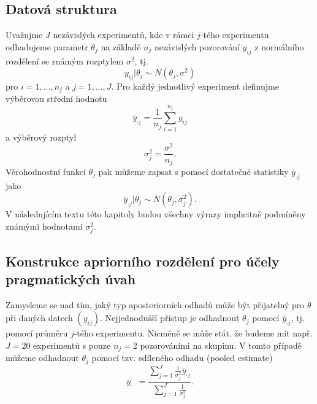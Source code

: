 \subsection{Datová struktura}

Uvažujme $J$ nezávislých experimentů, kde v rámci $j$-tého experimentu odhadujeme parametr $\theta_j$ na základě $n_j$ nezávislých pozorování $y_{ij}$ z normálního rozdělení se známým rozptylem $\sigma^2$, tj.
\begin{equation}
y_{ij} | \theta_j \sim N(\theta_j, \sigma^2)
\end{equation}
pro $i = 1, ..., n_j$ a $j = 1, ..., J$. Pro každý jednotlivý experiment definujme výběrovou střední hodnotu
\begin{equation}
\overline{y}_{\cdot j} = \frac{1}{n_j} \sum_{i = 1}^{n_j} y_{ij}
\end{equation}
a výběrový rozptyl
\begin{equation}
\sigma^2_j = \frac{\sigma^2}{n_j}.
\end{equation}
Věrohodnostní funkci $\theta_j$ pak můžeme zapsat s pomocí dostatečné statistiky $\overline{y}_{\cdot j}$ jako
\begin{equation}
\overline{y}_{\cdot j} | \theta_j \sim N(\theta_j, \sigma^2_j).
\end{equation}
V následujícím textu této kapitoly budou všechny výrazy implicitně podmíněny známými hodnotami $\sigma_j^2$.

\subsection{Konstrukce apriorního rozdělení pro účely pragmatických úvah}

Zamysleme se nad tím, jaký typ aposteriorních odhadů může být přijatelný pro $\theta$ při daných datech $(y_{ij})$. Nejjednodušší přístup je odhadnout $\theta_j$ pomocí $\overline{y}_{\cdot j}$, tj. pomocí průměru $j$-tého experimentu. Nicméně se může stát, že budeme mít např. $J = 20$ experimentů s pouze $n_j = 2$ pozorováními na skupinu. V tomto případě můžeme odhadnout $\theta_j$ pomocí tzv. sdíleného odhadu (pooled estimate)
\begin{equation}
\overline{y}_{\cdot \cdot} = \frac{\sum_{j = 1}^J \frac{1}{\sigma_j^2}\overline{y}_{\cdot j}}{\sum_{j = 1}^J \frac{1}{\sigma^2_j}}.
\end{equation}

